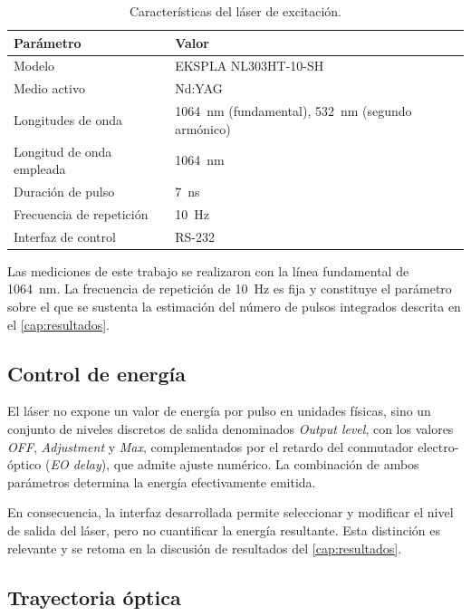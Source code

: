 \begin{table}[H]
  \centering
  \caption{Características del láser de excitación.}
  \label{tab:laser}
  \begin{tabular}{ll}
    \toprule
    \textbf{Parámetro} & \textbf{Valor} \\
    \midrule
    Modelo                    & EKSPLA NL303HT-10-SH \\
    Medio activo              & Nd:YAG \\
    Longitudes de onda        & \SI{1064}{\nano\meter} (fundamental),
                                \SI{532}{\nano\meter} (segundo armónico) \\
    Longitud de onda empleada & \SI{1064}{\nano\meter} \\
    Duración de pulso         & \SI{7}{\nano\second} \\
    Frecuencia de repetición  & \SI{10}{\hertz} \\
    Interfaz de control       & RS-232 \\
    \bottomrule
  \end{tabular}
\end{table}

Las mediciones de este trabajo se realizaron con la línea fundamental
de \SI{1064}{\nano\meter}. La frecuencia de repetición de
\SI{10}{\hertz} es fija y constituye el parámetro sobre el que se
sustenta la estimación del número de pulsos integrados descrita en el
\cref{cap:resultados}.

\subsection*{Control de energía}

El láser no expone un valor de energía por pulso en unidades físicas,
sino un conjunto de niveles discretos de salida denominados
\textit{Output level}, con los valores \textit{OFF},
\textit{Adjustment} y \textit{Max}, complementados por el retardo del
conmutador electro-óptico (\textit{EO delay}), que admite ajuste
numérico. La combinación de ambos parámetros determina la energía
efectivamente emitida.

En consecuencia, la interfaz desarrollada permite seleccionar y
modificar el nivel de salida del láser, pero no cuantificar la
energía resultante. Esta distinción es relevante y se retoma en la
discusión de resultados del \cref{cap:resultados}.

\subsection*{Trayectoria óptica}

